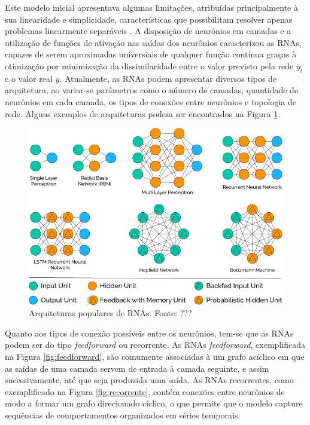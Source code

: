 Este modelo inicial apresentava algumas limitações, atribuídas principalmente à sua linearidade e simplicidade, características que possibilitam resolver apenas problemas linearmente separáveis \cite{Teresa:Livro}. A disposição de neurônios em camadas e a utilização de funções de ativação nas saídas dos neurônios caracterizou as RNAs, capazes de serem aproximadas universiais de qualquer função contínua graças à otimização por minimização da dissimilaridade entre o valor previsto pela rede $y_t$ e o valor real $y$. Atualmente, as RNAs podem apresentar diversos tipos de arquitetura, ao variar-se parâmetros como o número de camadas, quantidade de neurônios em cada camada, os tipos de conexões entre neurônios e topologia de rede. Alguns exemplos de arquiteturas podem ser encontrados na Figura \ref{fig:popular_archs}.

\begin{figure}[!h]
	\caption{Arquiteturas populares de RNAs. Fonte: ???}
	\label{fig:popular_archs}
	\includegraphics[width=\linewidth]{img/popular_archs}
\end{figure}


Quanto aos tipos de conexão possíveis entre os neurônios, tem-se que as RNAs podem ser do tipo \emph{feedforward} ou recorrente. As RNAs \emph{feedforward}, exemplificada na Figura \ref{fig:feedforward}, são comumente associadas à um grafo acíclico em que as saídas de uma camada servem de entrada à camada seguinte, e assim sucessivamente, até que seja produzida uma saída. As RNAs recorrentes, como exemplificado na Figura \ref{fig:recorrente}, contém conexões entre neurônios de modo a formar um grafo direcionado cíclico, o que permite que o modelo capture sequências de comportamentos organizados em séries temporais.

